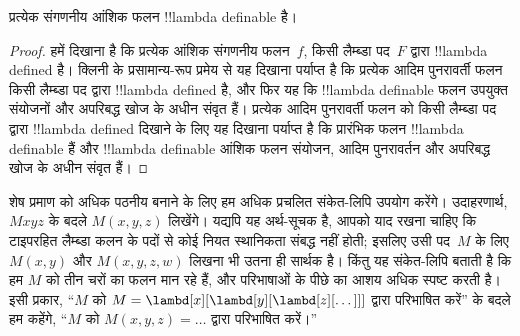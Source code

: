 \documentclass[../../../include/open-logic-section]{subfiles}
\begin{document}

\begin{thm}
प्रत्येक संगणनीय आंशिक फलन !!{lambda definable} है।
\end{thm}

\begin{proof}
हमें दिखाना है कि प्रत्येक आंशिक संगणनीय फलन~$f$, किसी लैम्ब्डा पद~$F$
द्वारा !!{lambda defined} है। क्लिनी के प्रसामान्य-रूप प्रमेय से यह दिखाना
पर्याप्त है कि प्रत्येक आदिम पुनरावर्ती फलन किसी लैम्ब्डा पद द्वारा
!!{lambda defined} है, और फिर यह कि !!{lambda definable} फलन उपयुक्त
संयोजनों और अपरिबद्ध खोज के अधीन संवृत हैं। प्रत्येक आदिम पुनरावर्ती फलन
को किसी लैम्ब्डा पद द्वारा !!{lambda defined} दिखाने के लिए यह दिखाना
पर्याप्त है कि प्रारंभिक फलन !!{lambda definable} हैं और !!{lambda
definable} आंशिक फलन संयोजन, आदिम पुनरावर्तन और अपरिबद्ध खोज के अधीन संवृत
हैं।
\end{proof}

शेष प्रमाण को अधिक पठनीय बनाने के लिए हम अधिक प्रचलित संकेत-लिपि उपयोग
करेंगे। उदाहरणार्थ, $Mxyz$ के बदले $M(x, y, z)$ लिखेंगे। यद्यपि यह
अर्थ-सूचक है, आपको याद रखना चाहिए कि टाइपरहित लैम्ब्डा कलन के पदों से कोई
नियत स्थानिकता संबद्ध नहीं होती; इसलिए उसी पद~$M$ के लिए $M(x,y)$ और
$M(x,y,z,w)$ लिखना भी उतना ही सार्थक है। किंतु यह संकेत-लिपि बताती है कि
हम $M$ को तीन चरों का फलन मान रहे हैं, और परिभाषाओं के पीछे का आशय अधिक
स्पष्ट करती है। इसी प्रकार, ``$M$ को $M =
\lambd[x][\lambd[y][\lambd[z][\dots]]]$ द्वारा परिभाषित करें'' के बदले हम
कहेंगे, ``$M$ को $M(x,y,z) = \dots$ द्वारा परिभाषित करें।''
\end{document}
